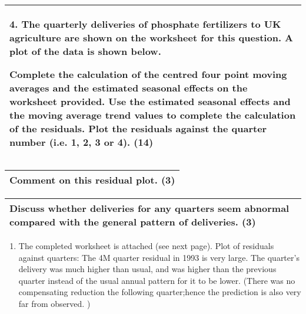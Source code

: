 \documentclass[a4paper,12pt]{article}
\begin{document}
\begin{table}[ht!]
 \centering
 \begin{tabular}{|p{15cm}|}
 \hline  
4. The quarterly deliveries of phosphate fertilizers to UK agriculture are shown on the worksheet for this question.  A plot of the data is shown below. 
 
Complete the calculation of the centred four point moving averages and the estimated seasonal effects on the worksheet provided.  Use the estimated seasonal effects and the moving average trend values to complete the calculation of the residuals.  Plot the residuals against the quarter number (i.e. 1, 2, 3 or 4). (14) 
 

 
 \\ \hline
  \end{tabular}
\end{table}
\begin{table}[ht!]
 \centering
 \begin{tabular}{|p{15cm}|}
 \hline  
Comment on this residual plot. 
(3) 
 \\ \hline
  \end{tabular}
\end{table}
\begin{table}[ht!]
 \centering
 \begin{tabular}{|p{15cm}|}
 \hline  
 
Discuss whether deliveries for any quarters seem abnormal compared with the general pattern of deliveries. (3)\\ \hline
  \end{tabular}
\end{table}
\newpage
\begin{enumerate}
    \item The completed worksheet is attached (see next page). Plot of residuals against quarters:
The 4M quarter residual in 1993 is very large. The quarter’s delivery was much higher than
usual, and was higher than the previous quarter instead of the usual annual pattern for it to
be lower. (There was no compensating reduction the following quarter;hence the prediction is
also very far from observed. )
\end{enumerate}
\end{document}
